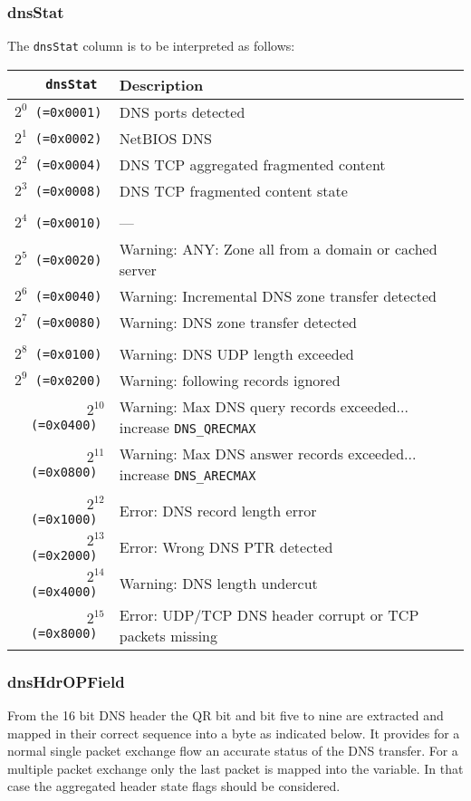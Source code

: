 \documentclass[documentation]{subfiles}
\begin{document}
\subsubsection{dnsStat}\label{dnsStat}
The {\tt dnsStat} column is to be interpreted as follows:
\begin{longtable}{>{\tt}rl}
    \toprule
    {\bf dnsStat}      & {\bf Description}\\
    \midrule\endhead%
    $2^{0}$  (=0x0001) & DNS ports detected\\
    $2^{1}$  (=0x0002) & NetBIOS DNS\\
    $2^{2}$  (=0x0004) & DNS TCP aggregated fragmented content\\
    $2^{3}$  (=0x0008) & DNS TCP fragmented content state\\
    \\
    $2^{4}$  (=0x0010) & ---\\
    $2^{5}$  (=0x0020) & Warning: ANY: Zone all from a domain or cached server\\
    $2^{6}$  (=0x0040) & Warning: Incremental DNS zone transfer detected\\
    $2^{7}$  (=0x0080) & Warning: DNS zone transfer detected\\
    \\
    $2^{8}$  (=0x0100) & Warning: DNS UDP length exceeded\\
    $2^{9}$  (=0x0200) & Warning: following records ignored\\
    $2^{10}$ (=0x0400) & Warning: Max DNS query records exceeded... increase {\tt DNS\_QRECMAX}\\
    $2^{11}$ (=0x0800) & Warning: Max DNS answer records exceeded... increase {\tt DNS\_ARECMAX}\\
    \\
    $2^{12}$ (=0x1000) & Error: DNS record length error\\
    $2^{13}$ (=0x2000) & Error: Wrong DNS PTR detected\\
    $2^{14}$ (=0x4000) & Warning: DNS length undercut\\
    $2^{15}$ (=0x8000) & Error: UDP/TCP DNS header corrupt or TCP packets missing\\
    \bottomrule
\end{longtable}

\subsubsection{dnsHdrOPField}\label{dnsHdrOPField}
From the 16 bit DNS header the QR bit and bit five to nine are extracted and mapped in their correct sequence
into a byte as indicated below. It provides for a normal single packet exchange flow an accurate status of the
DNS transfer. For a multiple packet exchange only the last packet is mapped into the variable.
In that case the aggregated header state flags should be considered.
\end{document}
